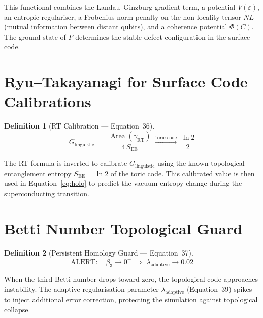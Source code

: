 \documentclass[11pt,a4paper]{article}
\newtheorem{definition}{Definition}[section]
\theoremstyle{remark}
\DeclareMathOperator{\Area}{Area}
\begin{document}
This functional combines the Landau--Ginzburg gradient term, a potential $V(\varepsilon)$, an entropic regulariser, a Frobenius-norm penalty on the non-locality tensor $NL$ (mutual information between distant qubits), and a coherence potential $\Phi(C)$.  The ground state of $F$ determines the stable defect configuration in the surface code.

\section{Ryu--Takayanagi for Surface Code Calibrations}
\label{sec:eq36}

\begin{definition}[RT Calibration --- Equation~36]
\begin{equation}\label{eq:rtcal}
    G_{\text{linguistic}} \;=\; \frac{\Area(\gamma_{\text{RT}})}{4\,S_{\text{EE}}}
        \;\xrightarrow{\text{toric code}}\; \frac{\ln 2}{2}
\end{equation}
\end{definition}

The RT formula is inverted to calibrate $G_{\text{linguistic}}$ using the known topological entanglement entropy $S_{\text{EE}} = \ln 2$ of the toric code.  This calibrated value is then used in Equation~\eqref{eq:holo} to predict the vacuum entropy change during the superconducting transition.

\section{Betti Number Topological Guard}
\label{sec:eq37}

\begin{definition}[Persistent Homology Guard --- Equation~37]
\begin{equation}\label{eq:bettyguard}
    \text{ALERT}:\quad \beta_3 \to 0^{+} \;\Longrightarrow\;
        \lambda_{\text{adaptive}} \to 0.02
\end{equation}
\end{definition}

When the third Betti number drops toward zero, the topological code approaches instability.  The adaptive regularisation parameter $\lambda_{\text{adaptive}}$ (Equation~39) spikes to inject additional error correction, protecting the simulation against topological collapse.

\end{document}
